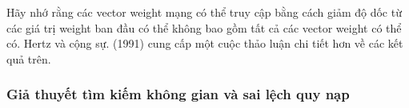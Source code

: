 Hãy nhớ rằng các vector weight mạng có thể truy cập bằng cách giảm độ dốc từ các giá trị weight ban đầu có thể không bao gồm tất cả các vector weight có thể có. Hertz và cộng sự. (1991) cung cấp một cuộc thảo luận chi tiết hơn về các kết quả trên.

\subsubsection{Giả thuyết tìm kiếm không gian và sai lệch quy nạp}

